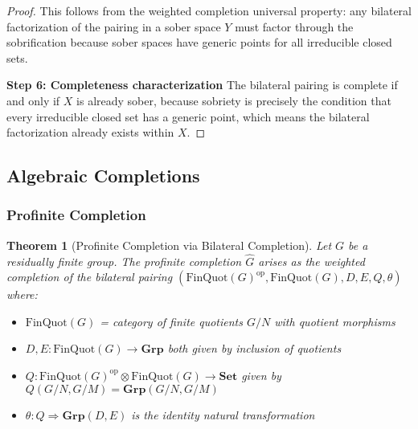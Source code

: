 \documentclass[11pt]{article}
\theoremstyle{plain}
\newtheorem{theorem}{Theorem}[section]
\theoremstyle{definition}
\theoremstyle{remark}
\newcommand{\op}{\mathrm{op}}
\begin{document}
\begin{proof}
This follows from the weighted completion universal property: any bilateral factorization of the pairing in a sober space $Y$ must factor through the sobrification because sober spaces have generic points for all irreducible closed sets.

\textbf{Step 6: Completeness characterization}
The bilateral pairing is complete if and only if $X$ is already sober, because sobriety is precisely the condition that every irreducible closed set has a generic point, which means the bilateral factorization already exists within $X$.
\end{proof}

\subsection{Algebraic Completions}

\subsubsection{Profinite Completion}

\begin{theorem}[Profinite Completion via Bilateral Completion]\label{thm:profinite-bilateral}
Let $G$ be a residually finite group. The profinite completion $\widehat{G}$ arises as the weighted completion of the bilateral pairing $(\mathrm{FinQuot}(G)^{\op}, \mathrm{FinQuot}(G), D, E, Q, \theta)$ where:
\begin{itemize}
\item $\mathrm{FinQuot}(G)$ = category of finite quotients $G/N$ with quotient morphisms
\item $D, E : \mathrm{FinQuot}(G) \to \mathbf{Grp}$ both given by inclusion of quotients
\item $Q : \mathrm{FinQuot}(G)^{\op} \otimes \mathrm{FinQuot}(G) \to \mathbf{Set}$ given by $Q(G/N, G/M) = \mathbf{Grp}(G/N, G/M)$
\item $\theta : Q \Rightarrow \mathbf{Grp}(D, E)$ is the identity natural transformation
\end{itemize}
\end{theorem}
\end{document}
